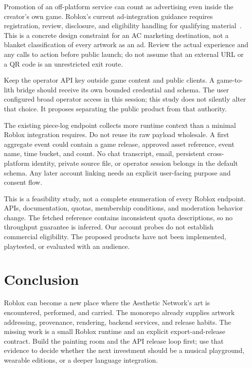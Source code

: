\documentclass[10pt,letterpaper,twocolumn]{article}
\begin{document}
Promotion of an off-platform service can count as advertising even inside the creator's own game. Roblox's current ad-integration guidance requires registration, review, disclosure, and eligibility handling for qualifying material~\cite{ads}. This is a concrete design constraint for an AC marketing destination, not a blanket classification of every artwork as an ad. Review the actual experience and any calls to action before public launch; do not assume that an external URL or a QR code is an unrestricted exit route.

Keep the operator API key outside game content and public clients. A game-to-lith bridge should receive its own bounded credential and schema. The user configured broad operator access in this session; this study does not silently alter that choice. It proposes separating the public product from that authority.

The existing piece-log endpoint collects more runtime context than a minimal Roblox integration requires. Do not reuse its raw payload wholesale. A first aggregate event could contain a game release, approved asset reference, event name, time bucket, and count. No chat transcript, email, persistent cross-platform identity, private source file, or operator session belongs in the default schema. Any later account linking needs an explicit user-facing purpose and consent flow.

This is a feasibility study, not a complete enumeration of every Roblox endpoint. APIs, documentation, quotas, membership conditions, and moderation behavior change. The fetched reference contains inconsistent quota descriptions, so no throughput guarantee is inferred. Our account probes do not establish commercial eligibility. The proposed products have not been implemented, playtested, or evaluated with an audience.

\newpage
\section{Conclusion}
Roblox can become a new place where the Aesthetic Network's art is encountered, performed, and carried. The monorepo already supplies artwork addressing, provenance, rendering, backend services, and release habits. The missing work is a small Roblox runtime and an explicit export-and-release contract. Build the painting room and the API release loop first; use that evidence to decide whether the next investment should be a musical playground, wearable editions, or a deeper language integration.


\end{document}

